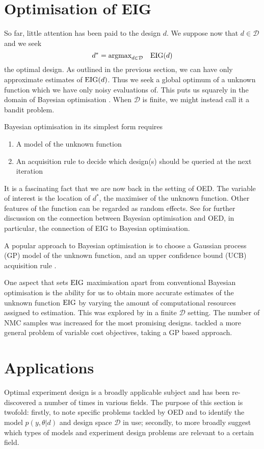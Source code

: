 \section{Optimisation of EIG}
\label{sec:opteig}
So far, little attention has been paid to the design $d$. We suppose now that $d \in \mathcal{D}$ and we seek
\begin{equation}
	d^* = \text{argmax}_{d\in\mathcal{D}} \quad \text{EIG}(d)
\end{equation}
the optimal design. As outlined in the previous section, we can have only approximate estimates of $\text{EIG}(d)$. Thus we seek a global optimum of a unknown function which we have only noisy evaluations of. This puts us squarely in the domain of Bayesian optimisation \cite{shahriari2016}. When $\mathcal{D}$ is finite, we might instead call it a bandit problem.

Bayesian optimisation in its simplest form requires
\begin{enumerate}
	\item A model of the unknown function
	\item An acquisition rule to decide which design(s) should be queried at the next iteration
\end{enumerate}
It is a fascinating fact that we are now back in the setting of OED. The variable of interest is the location of $d^*$, the maximiser of the unknown function. Other features of the function can be regarded as random effects. See \cite{pes} for further discussion on the connection between Bayesian optimisation and OED, in particular, the connection of EIG to Bayesian optimisation.

A popular approach to Bayesian optimisation is to choose a Gaussian process (GP) model of the unknown function, and an upper confidence bound (UCB) acquisition rule \cite{srinivas2009}.

One aspect that sets $\text{EIG}$ maximisation apart from conventional Bayesian optimisation is the ability for us to obtain more accurate estimates of the unknown function $\text{EIG}$ by varying the amount of computational resources assigned to estimation. This was explored by \cite{vincent2017} in a finite $\mathcal{D}$ setting. The number of NMC samples was increased for the most promising designs. \cite{mcleod2017} tackled a more general problem of variable cost objectives, taking a GP based approach.

\section{Applications}
Optimal experiment design is a broadly applicable subject and has been re-discovered a number of times in various fields. The purpose of this section is twofold: firstly, to note specific problems tackled by OED and to identify the model $p(y, \theta | d)$ and design space $\mathcal{D}$ in use; secondly, to more broadly suggest which types of models and experiment design problems are relevant to a certain field.

